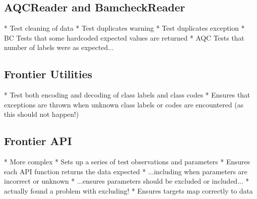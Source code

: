 \subsection{AQCReader and BamcheckReader}



* Test cleaning of data
* Test duplicates warning
* Test duplicates exception
* BC Tests that some hardcoded expected values are returned
* AQC Tests that number of labels were as expected...

\subsection{Frontier Utilities}
* Test both encoding and decoding of class labels and class codes
* Ensures that exceptions are thrown when unknown class labels or codes are
encountered (as this should not happen!)

\subsection{Frontier API}
* More complex
* Sets up a series of test observations and parameters
* Ensures each API function returns the data expected
* ...including when parameters are incorrect or unknown
* ...ensures parameters should be excluded or included...
* actually found a problem with excluding!
* Ensures targets map correctly to data


